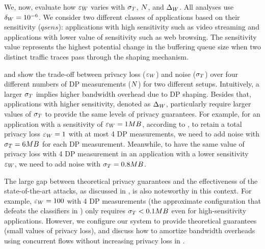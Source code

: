 We, now,  evaluate how $\varepsilon_{W}$ varies with $\sigma_T$, $N$, and $\Delta_{W}$.
All analyses use $\delta_W = 10^{-6}$.
We consider two different classes of applications based on their sensitivity ($qsens$): applications with high sensitivity such as video streaming and applications with lower value of sensitivity such as web browsing.
The sensitivity value represents the highest potential change in the buffering queue size when two distinct traffic traces pass through the shaping mechanism.


 and  show the trade-off between privacy loss ($\varepsilon_{W}$) and noise ($\sigma_T$) over four different numbers of DP measurements ($N$) for two different setups.
Intuitively, a larger $\sigma_T$ implies higher bandwidth overhead due to DP shaping.
Besides that, applications with higher sensitivity, denoted as $\Delta_{W}$, particularly require larger values of $\sigma_T$ to provide the same levels of privacy guarantees.
For example, for an application with a sensitivity of $\varepsilon_{W}=1MB$, according to , to retain a total privacy loss $\varepsilon_{W} = 1$ with at most 4 DP measurements, we need to add noise with $\sigma_T = 6 MB$ for each DP measurement.
Meanwhile, to have the same value of privacy loss with 4 DP measurement in an application with a lower sensitivity $\varepsilon_{W}$, we need to add noise with $\sigma_T = 0.8 MB$.

The large gap between theoretical privacy guarantees and the effectiveness of the state-of-the-art attacks, as discussed in , is also noteworthy in this context.
For example, $\varepsilon_{W} = 100$ with 4 DP measurements (the approximate configuration that defeats the classifiers in ) only requires $\sigma_T < 0.1 MB$ even for high-sensitivity applications.
However, we configure our system to provide theoretical guarantees (\ie small values of privacy loss), and discuss how to amortize bandwidth overheads using concurrent flows without increasing privacy loss in .

